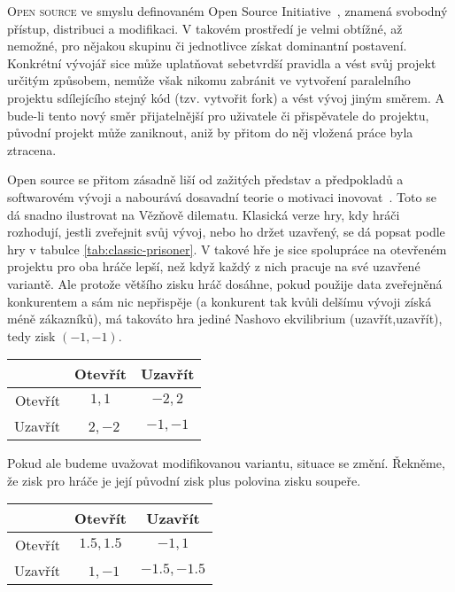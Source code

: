 \listoftodos
\hrulefill
\begin{multicols}{2}
\lettrine[nindent=0em,lines=3]{O}{pen source} ve smyslu definovaném Open Source Initiative~\cite{OSI-2011}, znamená svobodný přístup, distribuci a modifikaci. V takovém prostředí je velmi obtížné, až nemožné, pro nějakou skupinu či jednotlivce získat dominantní postavení. Konkrétní vývojář sice může uplatňovat sebetvrdší pravidla a vést svůj projekt určitým způsobem, nemůže však nikomu zabránit ve vytvoření paralelního projektu sdílejícího stejný kód (tzv. vytvořit fork) a vést vývoj jiným směrem. A bude-li tento nový směr přijatelnější pro uživatele či přispěvatele do projektu, původní projekt může zaniknout, aniž by přitom do něj vložená práce byla ztracena.

Open source se přitom zásadně liší od zažitých představ a předpokladů a softwarovém vývoji a nabourává dosavadní teorie o motivaci inovovat~\cite{promise-of-research-opensource}. Toto se dá snadno ilustrovat na Vězňově dilematu. Klasická verze hry, kdy hráči rozhodují, jestli zveřejnit svůj vývoj, nebo ho držet uzavřený, se dá popsat podle hry v tabulce \ref{tab:classic-prisoner}. V takové hře je sice spolupráce na otevřeném projektu pro oba hráče lepší, než když každý z nich pracuje na své uzavřené variantě. Ale protože většího zisku hráč dosáhne, pokud použije data zveřejněná konkurentem a sám nic nepřispěje (a konkurent tak kvůli delšímu vývoji získá méně zákazníků), má takováto hra jediné Nashovo ekvilibrium (uzavřít,uzavřít), tedy zisk $(-1,-1)$.

\begin{Figure}
\begin{center}
\begin{tabular}{r| c c}
		& Otevřít & Uzavřít \\
		\hline
	Otevřít & $1,1$ & $-2,2$ \\
	Uzavřít & $2,-2$ &\cellcolor{gray!20}  $-1,-1$ \\
\end{tabular}
\end{center}
\label{tab:classic-prisoner}
\end{Figure}

Pokud ale budeme uvažovat modifikovanou variantu, situace se změní. Řekněme, že zisk pro hráče je její původní zisk plus polovina zisku soupeře.

\begin{Figure}
\begin{center}
\begin{tabular}{r| c c}
		& Otevřít & Uzavřít \\
		\hline
	Otevřít &\cellcolor{gray!20}  $1.5,1.5$ & $-1,1$ \\
	Uzavřít & $1,-1$ &\cellcolor{gray!20}  $-1.5,-1.5$ \\
\end{tabular}
\end{center}
\label{tab:new-prisoner}
\end{Figure}


\end{multicols}
